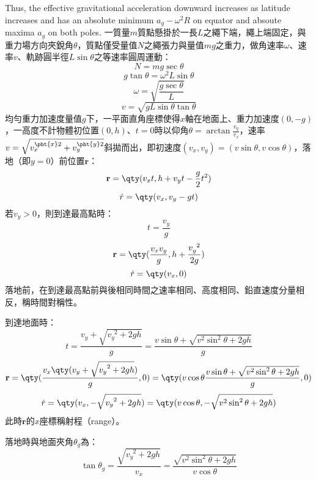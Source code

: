 \documentclass[a4paper,12pt]{article}
\begin{document}
Thus, the effective gravitational acceleration downward increases as latitude increases and has an absolute minimum $a_g-\omega^2R$ on equator and absoute maxima $a_g$ on both poles.
一質量$m$質點懸掛於一長$L$之繩下端，繩上端固定，與重力場方向夾銳角$\theta$，質點僅受量值$N$之繩張力與量值$mg$之重力，做角速率$\omega$、速率$v$、軌跡圓半徑$L\sin\theta$之等速率圓周運動：
\[N=mg\sec\theta\]
\[g\tan\theta=\omega^2L\sin\theta\]
\[\omega=\sqrt{\frac{g\sec\theta}{L}}\]
\[v=\sqrt{gL\sin\theta\tan\theta}\]
均勻重力加速度量值$g$下，一平面直角座標使得$x$軸在地面上、重力加速度$(0,-g)$，一高度不計物體初位置$(0,h)$、$t=0$時以仰角$\theta=\arctan\frac{v_y}{v_x}$，速率$v=\sqrt{v_x^{\pht{x}2}+v_y^{\pht{y}2}}$斜拋而出，即初速度$(v_x,v_y)=(v\sin\theta,v\cos\theta)$，落地（即$y=0$）前位置$\mathbf{r}$：
\[\mathbf{r}=\qty(v_xt,h+v_yt-\frac{g}{2}t^2)\]
\[\dot{r}=\qty(v_x,v_y-gt)\]
若$v_y>0$，則到達最高點時：
\[t=\frac{v_y}{g}\]
\[\mathbf{r}=\qty(\frac{v_xv_y}{g},h+\frac{v_y^{\phantom{y}2}}{2g})\]
\[\dot{r}=\qty(v_x,0)\]
落地前，在到達最高點前與後相同時間之速率相同、高度相同、鉛直速度分量相反，稱時間對稱性。

到達地面時：
\[t=\frac{v_y+\sqrt{v_y^{\phantom{y}2}+2gh}}{g}=\frac{v\sin\theta+\sqrt{v^2\sin^2\theta+2gh}}{g}\]
\[\mathbf{r}=\qty(\frac{v_x\qty(v_y+\sqrt{v_y^{\phantom{y}2}+2gh})}{g},0)=\qty(v\cos\theta\frac{v\sin\theta+\sqrt{v^2\sin^2\theta+2gh}}{g},0)\]
\[\dot{r}=\qty(v_x,-\sqrt{v_y^{\phantom{y}2}+2gh})=\qty(v\cos\theta,-\sqrt{v^2\sin^2\theta+2gh})\]
此時$\mathbf{r}$的$x$座標稱射程（range）。

落地時與地面夾角$\theta_g$為：
\[\tan\theta_g=\frac{\sqrt{v_y^{\phantom{y}2}+2gh}}{v_x}=\frac{\sqrt{v^2\sin^2\theta+2gh}}{v\cos\theta}\]
\end{document}
